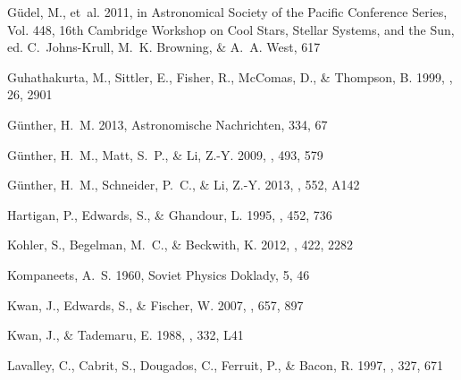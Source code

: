 \documentclass[manuscript]{aastex}
\begin{document}
\begin{thebibliography}{53}
{G{\"u}del}, M., {et~al.} 2011, in Astronomical Society of the Pacific
  Conference Series, Vol. 448, 16th Cambridge Workshop on Cool Stars, Stellar
  Systems, and the Sun, ed. C.~{Johns-Krull}, M.~K. {Browning}, \& A.~A.
  {West}, 617

{Guhathakurta}, M., {Sittler}, E., {Fisher}, R., {McComas}, D., \& {Thompson},
  B. 1999, \grl, 26, 2901

{G{\"u}nther}, H.~M. 2013, Astronomische Nachrichten, 334, 67

{G{\"u}nther}, H.~M., {Matt}, S.~P., \& {Li}, Z.-Y. 2009, \aap, 493, 579

{G{\"u}nther}, H.~M., {Schneider}, P.~C., \& {Li}, Z.-Y. 2013, \aap, 552, A142

{Hartigan}, P., {Edwards}, S., \& {Ghandour}, L. 1995, \apj, 452, 736

{Kohler}, S., {Begelman}, M.~C., \& {Beckwith}, K. 2012, \mnras, 422, 2282

{Kompaneets}, A.~S. 1960, Soviet Physics Doklady, 5, 46

{Kwan}, J., {Edwards}, S., \& {Fischer}, W. 2007, \apj, 657, 897

{Kwan}, J., \& {Tademaru}, E. 1988, \apjl, 332, L41

{Lavalley}, C., {Cabrit}, S., {Dougados}, C., {Ferruit}, P., \& {Bacon}, R.
  1997, \aap, 327, 671


\end{thebibliography}
\end{document}
